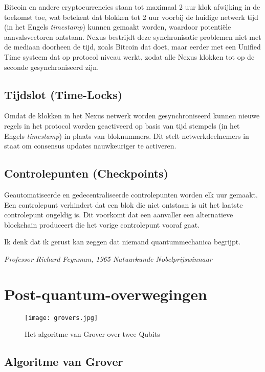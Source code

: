 \documentclass[11pt]{article}
\begin{document}
Bitcoin en andere cryptocurrencies staan tot maximaal 2 uur klok afwijking in de toekomst toe, wat betekent dat blokken tot 2 uur voorbij de huidige netwerk tijd (in het Engels \textit{timestamp}) kunnen gemaakt worden, waardoor potentiële aanvalsvectoren ontstaan. 
Nexus bestrijdt deze synchronisatie problemen niet met de mediaan doorheen de tijd, zoals Bitcoin dat doet, maar eerder met een Unified Time systeem dat op protocol niveau werkt, zodat alle Nexus klokken tot op de seconde gesynchroniseerd zijn.

\subsection{Tijdslot (Time-Locks)}

Omdat de klokken in het Nexus netwerk worden gesynchroniseerd kunnen nieuwe regels in het protocol worden geactiveerd op basis van tijd stempels (in het Engels \textit{timestamp}) in plaats van bloknummers. Dit stelt netwerkdeelnemers in staat om consensus updates nauwkeuriger te activeren.


\subsection{Controlepunten (Checkpoints)}

Geautomatiseerde en gedecentraliseerde controlepunten worden elk uur gemaakt. Een controlepunt verhindert dat een blok die niet ontstaan is uit het laatste controlepunt ongeldig is. Dit voorkomt dat een aanvaller een alternatieve blockchain produceert die het vorige controlepunt vooraf gaat.

\bigskip
\epigraph{Ik denk dat ik gerust kan zeggen dat niemand quantummechanica	begrijpt.
}{\textit{\footnotesize{Professor Richard Feynman, 1965 Natuurkunde Nobelprijswinnaar \cite{nobelfeynman}}}}

\pagebreak
\section{Post-quantum-overwegingen}

\begin{wrapfigure}{r}{0.60\textwidth} %
	\vspace{-15pt}
    \centering
    \texttt{[image: grovers.jpg]}
    \caption{Het algoritme van Grover over twee Qubits}
\end{wrapfigure}

\subsection{Algoritme van Grover}
\end{document}
